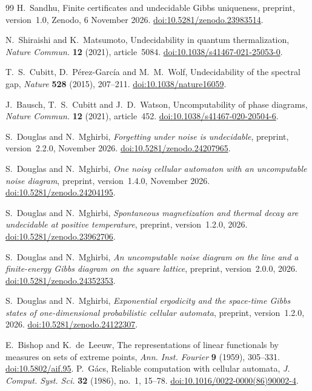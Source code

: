 \begin{thebibliography}{99}
H.~Sandhu,
Finite certificates and undecidable Gibbs uniqueness,
preprint, version~1.0, Zenodo, 6 November 2026.
\href{https://doi.org/10.5281/zenodo.23983514}{doi:10.5281/zenodo.23983514}.

N.~Shiraishi and K.~Matsumoto,
Undecidability in quantum thermalization,
\emph{Nature Commun.} \textbf{12} (2021), article~5084.
\href{https://doi.org/10.1038/s41467-021-25053-0}{doi:10.1038/s41467-021-25053-0}.

T.~S.~Cubitt, D.~P\'erez-Garc\'ia and M.~M.~Wolf,
Undecidability of the spectral gap,
\emph{Nature} \textbf{528} (2015), 207--211.
\href{https://doi.org/10.1038/nature16059}{doi:10.1038/nature16059}.

J.~Bausch, T.~S.~Cubitt and J.~D.~Watson,
Uncomputability of phase diagrams,
\emph{Nature Commun.} \textbf{12} (2021), article~452.
\href{https://doi.org/10.1038/s41467-020-20504-6}{doi:10.1038/s41467-020-20504-6}.

S.~Douglas and N.~Mghirbi,
\emph{Forgetting under noise is undecidable},
preprint, version~2.2.0, November 2026.
\href{https://doi.org/10.5281/zenodo.24207965}{doi:10.5281/zenodo.24207965}.

S.~Douglas and N.~Mghirbi,
\emph{One noisy cellular automaton with an uncomputable noise diagram},
preprint, version~1.4.0, November 2026.
\href{https://doi.org/10.5281/zenodo.24204195}{doi:10.5281/zenodo.24204195}.

S.~Douglas and N.~Mghirbi,
\emph{Spontaneous magnetization and thermal decay are undecidable at positive temperature},
preprint, version~1.2.0, 2026.
\href{https://doi.org/10.5281/zenodo.23962706}{doi:10.5281/zenodo.23962706}.


S.~Douglas and N.~Mghirbi,
\emph{An uncomputable noise diagram on the line and a finite-energy Gibbs
diagram on the square lattice}, preprint, version~2.0.0, 2026.
\href{https://doi.org/10.5281/zenodo.24352353}{doi:10.5281/zenodo.24352353}.

S.~Douglas and N.~Mghirbi,
\emph{Exponential ergodicity and the space-time Gibbs states of
one-dimensional probabilistic cellular automata},
preprint, version~1.2.0, 2026.
\href{https://doi.org/10.5281/zenodo.24122307}{doi:10.5281/zenodo.24122307}.

E.~Bishop and K.~de~Leeuw,
The representations of linear functionals by measures on sets of extreme points,
\emph{Ann. Inst. Fourier} \textbf{9} (1959), 305--331.
\href{https://doi.org/10.5802/aif.95}{doi:10.5802/aif.95}.
P.~G\'acs,
Reliable computation with cellular automata,
\emph{J. Comput. Syst. Sci.} \textbf{32} (1986), no.~1, 15--78.
\href{https://doi.org/10.1016/0022-0000(86)90002-4}{doi:10.1016/0022-0000(86)90002-4}.


\end{thebibliography}

